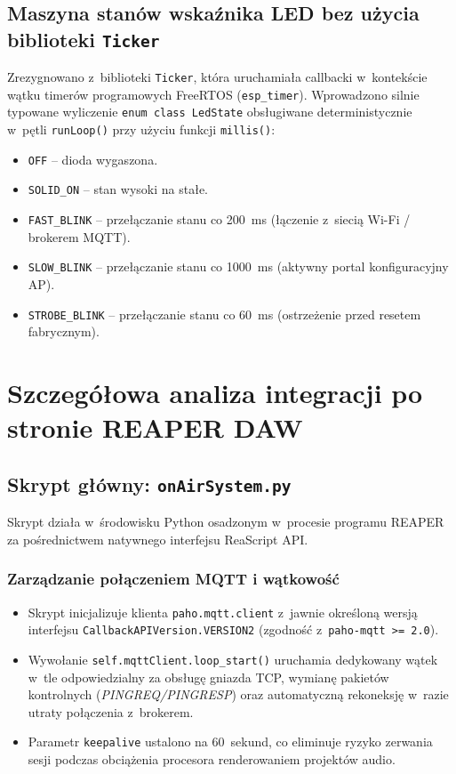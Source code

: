 \documentclass[11pt,a4paper]{article}
\begin{document}
\subsection{Maszyna stanów wskaźnika LED bez użycia biblioteki \texttt{Ticker}}
Zrezygnowano z~biblioteki \texttt{Ticker}, która uruchamiała callbacki w~kontekście wątku timerów programowych FreeRTOS (\texttt{esp\_timer}). Wprowadzono silnie typowane wyliczenie \texttt{enum class LedState} obsługiwane deterministycznie w~pętli \texttt{runLoop()} przy użyciu funkcji \texttt{millis()}:
\begin{itemize}[leftmargin=1.5em]
    \item \texttt{OFF} -- dioda wygaszona.
    \item \texttt{SOLID\_ON} -- stan wysoki na stałe.
    \item \texttt{FAST\_BLINK} -- przełączanie stanu co 200~ms (łączenie z~siecią Wi-Fi / brokerem MQTT).
    \item \texttt{SLOW\_BLINK} -- przełączanie stanu co 1000~ms (aktywny portal konfiguracyjny AP).
    \item \texttt{STROBE\_BLINK} -- przełączanie stanu co 60~ms (ostrzeżenie przed resetem fabrycznym).
\end{itemize}

\newpage

\section{Szczegółowa analiza integracji po stronie REAPER DAW}

\subsection{Skrypt główny: \texttt{onAirSystem.py}}
Skrypt działa w~środowisku Python osadzonym w~procesie programu REAPER za pośrednictwem natywnego interfejsu ReaScript API.

\subsubsection{Zarządzanie połączeniem MQTT i wątkowość}
\begin{itemize}[leftmargin=1.5em]
    \item Skrypt inicjalizuje klienta \texttt{paho.mqtt.client} z~jawnie określoną wersją interfejsu \texttt{CallbackAPIVersion.VERSION2} (zgodność z~\texttt{paho-mqtt >= 2.0}).
    \item Wywołanie \texttt{self.mqttClient.loop\_start()} uruchamia dedykowany wątek w~tle odpowiedzialny za obsługę gniazda TCP, wymianę pakietów kontrolnych (\textit{PINGREQ/PINGRESP}) oraz automatyczną rekoneksję w~razie utraty połączenia z~brokerem.
    \item Parametr \texttt{keepalive} ustalono na 60~sekund, co eliminuje ryzyko zerwania sesji podczas obciążenia procesora renderowaniem projektów audio.
\end{itemize}
\end{document}
